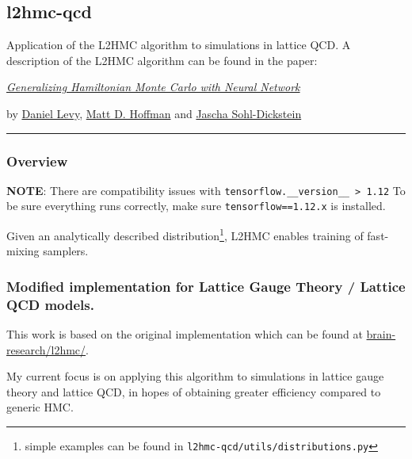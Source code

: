 \hypertarget{l2hmc-qcd}{%
\subsection{l2hmc-qcd}\label{l2hmc-qcd}}

Application of the L2HMC algorithm to simulations in lattice QCD. A
description of the L2HMC algorithm can be found in the paper:

\href{https://arxiv.org/abs/1711.09268}{\emph{Generalizing Hamiltonian
Monte Carlo with Neural Network}}

by \href{http://ai.stanford.edu/~danilevy}{Daniel Levy},
\href{http://matthewdhoffman.com/}{Matt D. Hoffman} and
\href{sohldickstein.com}{Jascha Sohl-Dickstein}

\begin{center}\rule{0.5\linewidth}{\linethickness}\end{center}

\hypertarget{overview}{%
\subsubsection{Overview}\label{overview}}

\textbf{NOTE}: There are compatibility issues with
\texttt{tensorflow.\_\_version\_\_\ \textgreater{}\ 1.12} To be sure
everything runs correctly, make sure \texttt{tensorflow==1.12.x} is
installed.

\vspace{10px}
\noindent
Given an analytically described distribution\footnote{simple examples can be
found in \texttt{l2hmc-qcd/utils/distributions.py}}, L2HMC enables training of
fast-mixing samplers.
%
\hypertarget{modified-implementation-for-lattice-gauge-theory-lattice-qcd-models.}{%
\subsubsection{Modified implementation for Lattice Gauge Theory / Lattice QCD
models.}%
\label{modified-implementation-for-lattice-gauge-theory-lattice-qcd-models.}}

This work is based on the original implementation which can be found at
\href{https://github.com/brain-research/l2hmc}{brain-research/l2hmc/}.
 
\vspace{10px}
\noindent
My current focus is on applying this algorithm to simulations in lattice
gauge theory and lattice QCD, in hopes of obtaining greater efficiency
compared to generic HMC.

